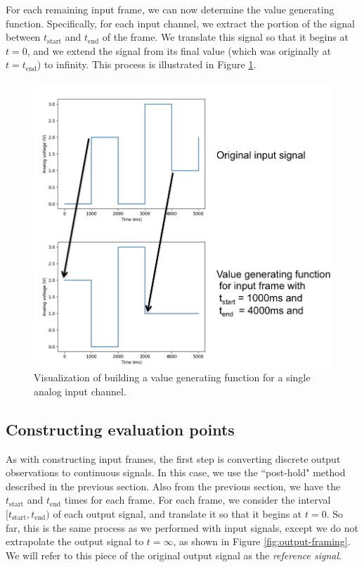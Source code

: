 \documentclass[12pt]{article}
\begin{document}
For each remaining input frame, we can now determine the value generating function.  Specifically, for each input channel, we extract the portion of the signal between $t_{\text{start}}$ and $t_{\text{end}}$ of the frame.  We translate this signal so that it begins at $t=0$, and we extend the signal from its final value (which was originally at $t=t_{\text{end}}$) to infinity.  This process is illustrated in Figure \ref{fig:input-framing}.

\begin{figure}[ht]
\centering
\includegraphics[width=0.6\linewidth]{input-framing.png}
\caption{Visualization of building a value generating function for a single analog input channel.}
\label{fig:input-framing}
\end{figure}

\subsection{Constructing evaluation points}
\label{sec:using-point-templates}
As with constructing input frames, the first step is converting discrete output observations to continuous signals.  In this case, we use the ``post-hold" method described in the previous section.  Also from the previous section, we have the $t_{\text{start}}$ and $t_{\text{end}}$ times for each frame.  For each frame, we consider the interval $[t_{\text{start}}, t_{\text{end}})$ of each output signal, and translate it so that it begins at $t=0$.  So far, this is the same process as we performed with input signals, except we do not extrapolate the output signal to $t=\infty$, as shown in Figure \ref{fig:output-framing}.  We will refer to this piece of the original output signal as the \textit{reference signal}.  
\end{document}
